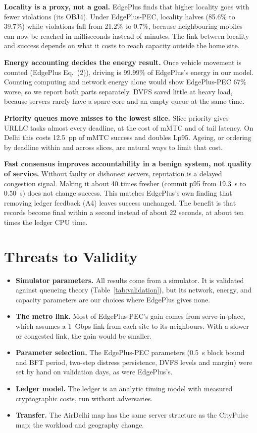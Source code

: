 \documentclass[11pt,journal,onecolumn]{IEEEtran}
\begin{document}
\textbf{Locality is a proxy, not a goal.} EdgePlus finds that higher locality goes with fewer violations (its OBJ4). Under EdgePlus-PEC, locality halves (85.6\% to 39.7\%) while violations fall from 21.2\% to 0.7\%, because neighbouring mobiles can now be reached in milliseconds instead of minutes. The link between locality and success depends on what it costs to reach capacity outside the home site.

\textbf{Energy accounting decides the energy result.} Once vehicle movement is counted (EdgePlus Eq.~(2)), driving is 99.99\% of EdgePlus's energy in our model. Counting computing and network energy alone would show EdgePlus-PEC 67\% worse, so we report both parts separately. DVFS saved little at heavy load, because servers rarely have a spare core and an empty queue at the same time.

\textbf{Priority queues move misses to the lowest slice.} Slice priority gives URLLC tasks almost every deadline, at the cost of mMTC and of tail latency. On Delhi this costs 12.5~pp of mMTC success and doubles Lp95. Ageing, or ordering by deadline within and across slices, are natural ways to limit that cost.

\textbf{Fast consensus improves accountability in a benign system, not quality of service.} Without faulty or dishonest servers, reputation is a delayed congestion signal. Making it about 40 times fresher (commit p95 from 19.3~s to 0.50~s) does not change success. This matches EdgePlus's own finding that removing ledger feedback (A4) leaves success unchanged. The benefit is that records become final within a second instead of about 22 seconds, at about ten times the ledger CPU time.

\section{Threats to Validity}
\label{sec:threats}
\begin{itemize}
\item \textbf{Simulator parameters.} All results come from a simulator. It is validated against queueing theory (Table~\ref{tab:validation}), but its network, energy, and capacity parameters are our choices where EdgePlus gives none.
\item \textbf{The metro link.} Most of EdgePlus-PEC's gain comes from serve-in-place, which assumes a 1~Gbps link from each site to its neighbours. With a slower or congested link, the gain would be smaller.
\item \textbf{Parameter selection.} The EdgePlus-PEC parameters (0.5~s block bound and BFT period, two-step distress persistence, DVFS levels and margin) were set by hand on validation days, as were EdgePlus's.
\item \textbf{Ledger model.} The ledger is an analytic timing model with measured cryptographic costs, run without adversaries.
\item \textbf{Transfer.} The AirDelhi map has the same server structure as the CityPulse map; the workload and geography change.
\end{itemize}
\end{document}
